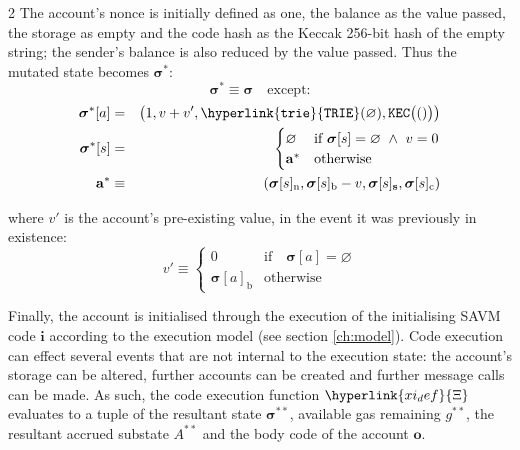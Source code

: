 \documentclass[9pt,oneside]{amsart}
\begin{document}
\begin{multicols}{2}
The account's nonce is initially defined as one, the balance as the value passed, the storage as empty and the code hash as the Keccak 256-bit hash of the empty string; the sender's balance is also reduced by the value passed. Thus the mutated state becomes $\boldsymbol{\sigma}^*$:
\begin{equation}
\boldsymbol{\sigma}^* \equiv \boldsymbol{\sigma} \quad \text{except:}
\end{equation}
\begin{eqnarray}
\boldsymbol{\sigma}^*[a] &=& \big( 1, v + v', \mathtt{\hyperlink{trie}{TRIE}}(\varnothing), \mathtt{KEC}\big(()\big) \big) \\
\boldsymbol{\sigma}^*[s] &=& \begin{cases}
\varnothing & \text{if}\ \boldsymbol{\sigma}[s] = \varnothing \ \wedge\ v = 0 \\
\mathbf{a}^* & \text{otherwise}
\end{cases} \\
\mathbf{a}^* &\equiv& (\boldsymbol{\sigma}[s]_{\mathrm{n}}, \boldsymbol{\sigma}[s]_{\mathrm{b}} - v, \boldsymbol{\sigma}[s]_{\mathbf{s}}, \boldsymbol{\sigma}[s]_{\mathrm{c}})
\end{eqnarray}

where $v'$ is the account's pre-existing value, in the event it was previously in existence:
\begin{equation}
v' \equiv \begin{cases}
0 & \text{if} \quad \boldsymbol{\sigma}[a] = \varnothing\\
\boldsymbol{\sigma}[a]_{\mathrm{b}} & \text{otherwise}
\end{cases}
\end{equation}


Finally, the account is initialised through the execution of the initialising SAVM code $\mathbf{i}$ according to the execution model (see section \ref{ch:model}).
Code execution can effect several events that are not internal to the execution state: the account's storage can be altered, further accounts can be created and further message calls can be made.
As such, the code execution function $\hyperlink{xi_def}{\Xi}$ evaluates to a tuple of the resultant state $\boldsymbol{\sigma}^{**}$, available gas remaining $g^{**}$, the resultant accrued substate $A^{**}$ and the body code of the account $\mathbf{o}$.


\end{multicols}
\end{document}
